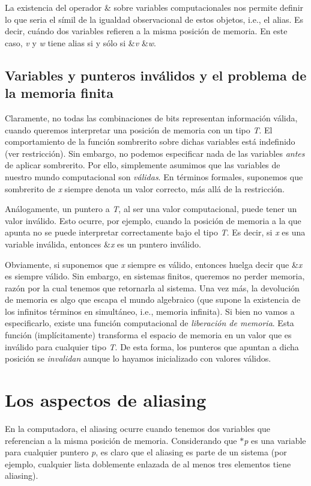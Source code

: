 \-La existencia del operador \& sobre variables computacionales nos permite definir lo que seria el símil de la igualdad observacional de estos objetos, i.\-e., el alias. \-Es decir, cuándo dos variables refieren a la misma posición de memoria. \-En este caso, {\itshape v\/} y {\itshape w\/} tiene alias si y sólo si \&{\itshape v\/}  \&{\itshape w\/}.\hypertarget{Aliasing_sec-invalido}{}\subsection{\-Variables y punteros inválidos y el problema de la memoria finita}\label{Aliasing_sec-invalido}
\-Claramente, no todas las combinaciones de bits representan información válida, cuando queremos interpretar una posición de memoria con un tipo {\itshape \-T\/}. \-El comportamiento de la función sombrerito sobre dichas variables está indefinido (ver restricción). \-Sin embargo, no podemos especificar nada de las variables {\itshape antes\/} de aplicar sombrerito. \-Por ello, simplemente asumimos que las variables de nuestro mundo computacional son {\itshape válidas\/}. \-En términos formales, suponemos que sombrerito de {\itshape x\/} siempre denota un valor correcto, más allá de la restricción.

\-Análogamente, un puntero a {\itshape \-T\/}, al ser una valor computacional, puede tener un valor inválido. \-Esto ocurre, por ejemplo, cuando la posición de memoria a la que apunta no se puede interpretar correctamente bajo el tipo {\itshape \-T\/}. \-Es decir, si {\itshape x\/} es una variable inválida, entonces \&{\itshape x\/} es un puntero inválido.

\-Obviamente, si suponemos que {\itshape x\/} siempre es válido, entonces huelga decir que \&{\itshape x\/} es siempre válido. \-Sin embargo, en sistemas finitos, queremos no perder memoria, razón por la cual tenemos que retornarla al sistema. \-Una vez más, la devolución de memoria es algo que escapa el mundo algebraico (que supone la existencia de los infinitos términos en simultáneo, i.\-e., memoria infinita). \-Si bien no vamos a especificarlo, existe una función computacional de {\itshape liberación de memoria\/}. \-Esta función (implícitamente) transforma el espacio de memoria en un valor  que es inválido para cualquier tipo {\itshape \-T\/}. \-De esta forma, los punteros que apuntan a dicha posición se {\itshape invalidan\/} aunque lo hayamos inicializado con valores válidos.\hypertarget{Aliasing_sec-aliasing}{}\section{\-Los aspectos de aliasing}\label{Aliasing_sec-aliasing}
\-En la computadora, el aliasing ocurre cuando tenemos dos variables que referencian a la misma posición de memoria. \-Considerando que $\ast${\itshape p\/} es una variable para cualquier puntero {\itshape p\/}, es claro que el aliasing es parte de un sistema (por ejemplo, cualquier lista doblemente enlazada de al menos tres elementos tiene aliasing).

